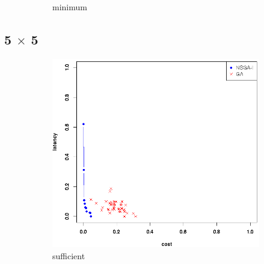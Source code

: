 \documentclass{llncs}
\begin{document}
\begin{figure}[H]
\begin{subfigure}[b]{0.3\textwidth}
		\caption{minimum}
	\end{subfigure}

	\caption{}\label{fig:condition}
\end{figure}

\subsection{5 $\times$ 5}
\begin{figure}[H]
	\centering
	\begin{subfigure}[b]{0.3\textwidth}
		\includegraphics[width=\textwidth]{pics/pop_50_gen_50_5_times_5_suff.png}
		\caption{sufficient}
	\end{subfigure}%
	\begin{subfigure}[b]{0.3\textwidth}

\end{subfigure}
\end{figure}
\end{document}
